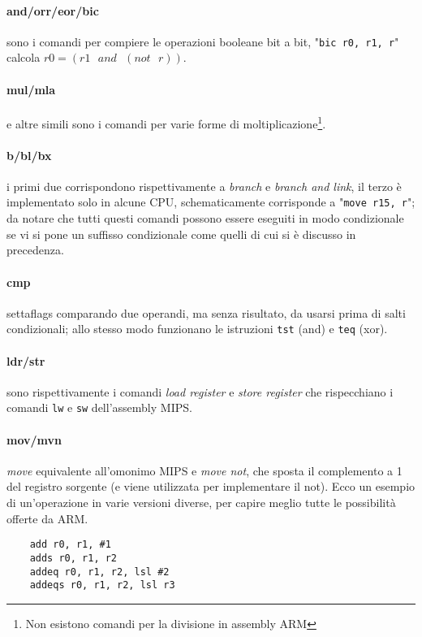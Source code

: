 \documentclass[class=book, crop=false, oneside]{standalone}
\begin{document}
\paragraph*{and/orr/eor/bic} sono i comandi per compiere le operazioni booleane bit a bit, "\texttt{bic r0, r1, r}" calcola $r0=(r1\text{ }and\text{ }(not\text{ }r))$.
\paragraph*{mul/mla} e altre simili sono i comandi per varie forme di moltiplicazione\footnote{Non esistono comandi per la divisione in assembly ARM}.
\paragraph*{b/bl/bx} i primi due corrispondono rispettivamente a \emph{branch} e \emph{branch and link}, il terzo è implementato solo in alcune CPU, schematicamente corrisponde a  "\texttt{move r15, r}"; da notare che tutti questi comandi possono essere eseguiti in modo condizionale se vi si pone un suffisso condizionale come quelli di cui si è discusso in precedenza.
\paragraph*{cmp} settaflags comparando due operandi, ma senza risultato, da usarsi prima di salti condizionali; allo stesso modo funzionano le istruzioni \texttt{tst} (and) e \texttt{teq} (xor).
\paragraph*{ldr/str} sono rispettivamente i comandi \emph{load register} e \emph{store register} che rispecchiano i comandi \texttt{lw} e \texttt{sw} dell'assembly MIPS.
\paragraph*{mov/mvn} \emph{move} equivalente all'omonimo MIPS e \emph{move not}, che sposta il complemento a 1 del registro sorgente (e viene utilizzata per implementare il not).
Ecco un esempio di un'operazione in varie versioni diverse, per capire meglio tutte le possibilità offerte da ARM.\\

\begin{verbatim}
	add r0, r1, #1
	adds r0, r1, r2
	addeq r0, r1, r2, lsl #2
	addeqs r0, r1, r2, lsl r3
\end{verbatim}
\end{document}
